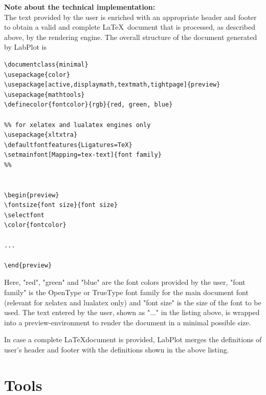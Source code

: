 \textbf{Note about the technical implementation:}\\
The text provided by the user is enriched with an appropriate header and footer to obtain a valid and complete \LaTeX\, document that is processed, as described above, by the rendering engine.
The overall structure of the document generated by LabPlot is
\begin{lstlisting}[language={[Latex]TeX}, backgroundcolor=\color{lightgray}, frame=single, morekeywords={definecolor,color,defaultfontfeatures,setmainfont}]
\documentclass{minimal}
\usepackage{color}
\usepackage[active,displaymath,textmath,tightpage]{preview}
\usepackage{mathtools}
\definecolor{fontcolor}{rgb}{red, green, blue}

%% for xelatex and lualatex engines only
\usepackage{xltxtra}
\defaultfontfeatures{Ligatures=TeX}
\setmainfont[Mapping=tex-text]{font family}
%%


\begin{preview}
\fontsize{font size}{font size}
\selectfont
\color{fontcolor}

...

\end{preview}

\end{lstlisting}
Here, "red", "green" and "blue" are the font colors provided by the user, "font family" is the OpenType or TrueType font family for the main document font (relevant for xelatex and lualatex only) and "font size" is the size of the font to be used. The text entered by the user, shown as "..." in the listing above, is wrapped into a preview-environment to render the document in a minimal possible size.

In case a complete \LaTeX document is provided, LabPlot merges the definitions of user's header and footer with the definitions shown in the above listing.



\chapter{Tools}\label{ch:tools}
